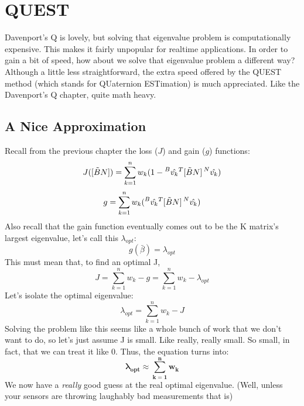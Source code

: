 \documentclass[a4paper,14pt]{extreport}
\newcommand{\vk}[1]{\prescript{#1}{}{\hat{v_k}}}
\begin{document}
\chapter{QUEST}
Davenport's Q is lovely, but solving that eigenvalue problem is computationally expensive. This makes it fairly unpopular for realtime applications. In order to gain a bit of speed, how about we solve that eigenvalue problem a different way? Although a little less straightforward, the extra speed offered by the QUEST method (which stands for QUaternion ESTimation) is much appreciated. Like the Davenport's Q chapter, quite math heavy.
\section{A Nice Approximation}
Recall from the previous chapter the loss ($J$) and gain ($g$) functions:
\[
J([\tilde{B}N]) = \sum^n_{k=1} w_k (1- \vk{B}^T[\tilde{B}N]\vk{N})
\]
\[
g = \sum^n_{k=1} w_k (\vk{B}^T[\tilde{B}N]\vk{N})
\]
Also recall that the gain function eventually comes out to be the K matrix's largest eigenvalue, let's call this $\lambda_{opt}$:
\[
g(\bar{\beta}) = \lambda_{opt}
\]
This must mean that, to find an optimal J,
\[
J = \sum^n_{k=1} w_k - g = \sum^n_{k=1} w_k - \lambda_{opt}
\]
Let's isolate the optimal eigenvalue:
\[
\lambda_{opt} = \sum^n_{k=1} w_k - J
\]
Solving the problem like this seems like a whole bunch of work that we don't want to do, so let's just assume J is small. Like really, really small. So small, in fact, that we can treat it like 0. Thus, the equation turns into:
\[
\mathbf{
\lambda_{opt} \approx \sum^n_{k=1} w_k
}\]
We now have a \emph{really} good guess at the real optimal eigenvalue. (Well, unless your sensors are throwing laughably bad measurements that is)
\end{document}
